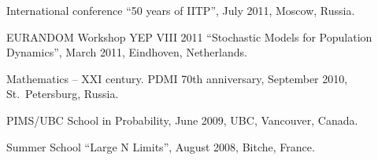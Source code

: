 \documentclass[letterpaper,11pt]{article}
\begin{document}
\begin{etaremune}
	\item
	      International conference ``50 years of IITP'', July 2011,
	      Moscow, Russia.

	\item
	      EURANDOM Workshop YEP VIII 2011 ``Stochastic Models for
	      Population Dynamics'', March 2011, Eindhoven, Netherlands.

	\item
	      Mathematics -- XXI century. PDMI 70th anniversary, September
	      2010, St.~Petersburg, Russia.

	\item
	      PIMS/UBC School in Probability, June 2009, UBC, Vancouver,
	      Canada.

	\item
	      Summer School ``Large N Limits'', August 2008, Bitche, France.
\end{etaremune}

\end{document}
